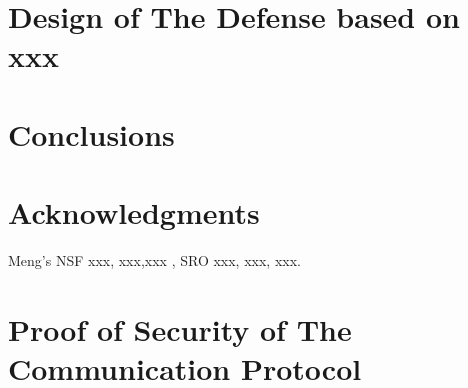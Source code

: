 \documentclass{sig-alternate}
\begin{document}
\section{Design of The Defense based on xxx}



\section{Conclusions}

\section{Acknowledgments}
Meng's NSF xxx, xxx,xxx , SRO xxx, xxx, xxx.




\balancecolumns

\appendix

\section{Proof of Security of The Communication Protocol}
\end{document}
